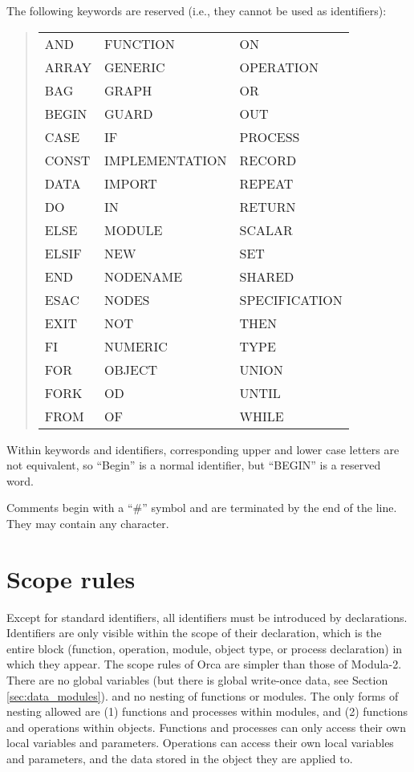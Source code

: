 \documentclass[10pt]{article}
\begin{document}
The following keywords are reserved (i.e., they cannot be used
as identifiers):

\begin{quote}
\begin{tabular}{l l l}
AND & FUNCTION & ON \\
ARRAY & GENERIC & OPERATION \\
BAG & GRAPH & OR \\
BEGIN & GUARD & OUT \\
CASE & IF & PROCESS \\
CONST & IMPLEMENTATION & RECORD \\
DATA & IMPORT & REPEAT \\
DO & IN & RETURN \\
ELSE & MODULE & SCALAR \\
ELSIF & NEW & SET \\
END & NODENAME & SHARED \\
ESAC & NODES & SPECIFICATION \\
EXIT & NOT & THEN \\
FI & NUMERIC & TYPE \\
FOR & OBJECT & UNION \\
FORK & OD & UNTIL \\
FROM & OF & WHILE \\
\end{tabular}
\end{quote}

Within keywords and identifiers, corresponding upper and lower case letters are
not equivalent, so ``Begin'' is a normal identifier, but ``BEGIN'' is
a reserved word.

Comments begin with a ``\#'' symbol and are terminated by the end of the line.
They may contain any character.
\section{Scope rules}\label{sec:scope}

Except for standard identifiers, all identifiers must be introduced
by declarations.
Identifiers are only visible within the scope of their declaration, which 
is the entire block (function, operation, module, object type, or process
declaration) in which they appear.
The scope rules of Orca are simpler than those of Modula-2.
There are no global variables (but there is global write-once data, see
Section \ref{sec:data_modules}).
and no nesting of functions or modules.
The only forms of nesting allowed are (1) functions and
processes within modules, and (2) functions and operations within objects.
Functions and processes can only access their own local variables
and parameters.
Operations can access their own local variables and parameters, and the
data stored in the object they are applied to.
\end{document}
